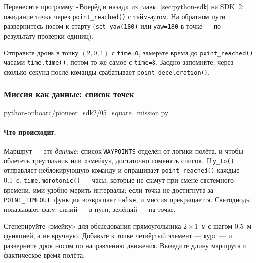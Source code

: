\begin{taskbox}
Перенесите программу «Вперёд и назад» из главы~\ref{sec:python-sdk} на SDK~2: ожидание точки через \verb|point_reached()| с тайм-аутом. На обратном пути развернитесь носом к старту (\verb|set_yaw(180)| или \verb|yaw=180| в точке --- по результату проверки единиц).
\end{taskbox}

\begin{taskbox}
Отправьте дрона в точку $(2, 0, 1)$ с \verb|time=0|, замерьте время до \verb|point_reached()| часами \verb|time.time()|; потом то же самое с \verb|time=8|. Заодно запомните, через сколько секунд после команды срабатывает \verb|point_deceleration()|.
\end{taskbox}

\subsubsection*{Миссия как данные: список точек}

\begin{codefile}[python]{python-onboard/pioneer_sdk2/05_square_mission.py}
\end{codefile}

\paragraph{Что происходит.} Маршрут --- это \emph{данные}: список \verb|WAYPOINTS| отделён от логики полёта, и чтобы облететь треугольник или «змейку», достаточно поменять список. \verb|fly_to()| отправляет неблокирующую команду и опрашивает \verb|point_reached()| каждые 0.1~с. \verb|time.monotonic()| --- часы, которые не скачут при смене системного времени, ими удобно мерить интервалы; если точка не достигнута за \verb|POINT_TIMEOUT|, функция возвращает \verb|False|, и миссия прекращается. Светодиоды показывают фазу: синий --- в пути, зелёный --- на точке.

\begin{taskbox}[Змейка]
Сгенерируйте «змейку» для обследования прямоугольника $2\times1$~м с шагом 0.5~м функцией, а не вручную. Добавьте к точке четвёртый элемент --- курс --- и разверните дрон носом по направлению движения. Выведите длину маршрута и фактическое время полёта.
\end{taskbox}

